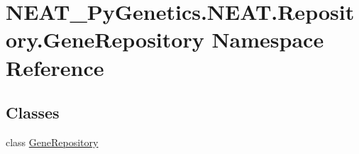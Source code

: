 \hypertarget{namespaceNEAT__PyGenetics_1_1NEAT_1_1Repository_1_1GeneRepository}{}\section{N\+E\+A\+T\+\_\+\+Py\+Genetics.\+N\+E\+A\+T.\+Repository.\+Gene\+Repository Namespace Reference}
\label{namespaceNEAT__PyGenetics_1_1NEAT_1_1Repository_1_1GeneRepository}
\subsection*{Classes}
\begin{DoxyCompactItemize}
\item 
class \hyperlink{classNEAT__PyGenetics_1_1NEAT_1_1Repository_1_1GeneRepository_1_1GeneRepository}{Gene\+Repository}
\end{DoxyCompactItemize}
